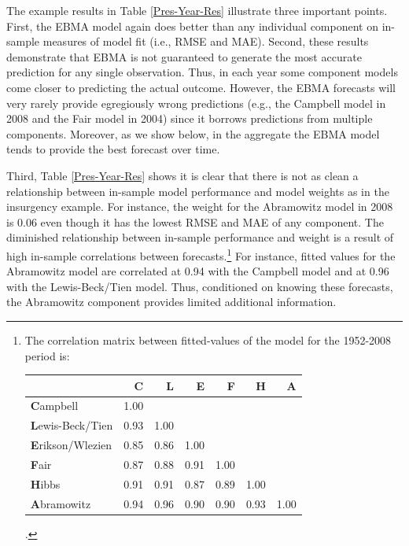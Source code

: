 \documentclass[12pt,fullpage]{article}
\newcommand{\note}[1]{\footnote{\doublespacing#1 \vspace{4 mm}}}
\begin{document}


The example results in Table \ref{Pres-Year-Res} illustrate three
important points.  First, the EBMA model again does better than any
individual component on in-sample measures of model fit (i.e., RMSE
and MAE).  Second, these results demonstrate that EBMA is not
guaranteed to generate the most accurate prediction for any single
observation.  Thus, in each year some component models come closer to
predicting the actual outcome.  However, the EBMA forecasts will very
rarely provide egregiously wrong predictions (e.g., the Campbell model
in 2008 and the Fair model in 2004) since it borrows predictions from
multiple components.  Moreover, as we show below, in the aggregate the
EBMA model tends to provide the best forecast over time.

Third, Table \ref{Pres-Year-Res} shows it is clear that there is
not as clean a relationship between in-sample model performance and
model weights as in the insurgency example.  For instance, the weight
for the Abramowitz model in 2008 is 0.06 even though it has the lowest
RMSE and MAE of any component.  The diminished relationship between
in-sample performance and weight is a result of high in-sample
correlations between forecasts.\note{The correlation matrix between
  fitted-values of the model for the
  1952-2008 period is: \\
\begin{tabular}{l  rrrrrr}
  \toprule
 & \textbf{C}& \textbf{L} & \textbf{E}& \textbf{F} & \textbf{H} & \textbf{A} \\ 
  \midrule
\textbf{C}ampbell& 1.00 & & & & & \\ 
 \textbf{L}ewis-Beck/Tien& 0.93 & 1.00 & & & & \\ 
\textbf{E}rikson/Wlezien & 0.85 & 0.86 & 1.00 & & & \\ 
\textbf{F}air & 0.87 & 0.88 & 0.91 & 1.00 & & \\ 
\textbf{H}ibbs& 0.91 & 0.91 & 0.87 & 0.89 & 1.00 & \\ 
\textbf{A}bramowitz & 0.94 & 0.96 & 0.90 & 0.90 & 0.93 & 1.00 \\ 
   \bottomrule
 \end{tabular}.}  For
instance, fitted values for the Abramowitz model are correlated at
0.94 with the Campbell model and at 0.96 with the Lewis-Beck/Tien
model. Thus, conditioned on knowing these forecasts, the Abramowitz
component provides limited additional information.  
\end{document}
